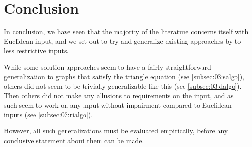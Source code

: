 \section{Conclusion}

In conclusion, we have seen that the majority of the literature concerns itself with Euclidean input,
and we set out to try and generalize existing approaches by \citeauthor{tsiligiridis_heuristic_1984} to less restrictive inputs. 

While some solution approaches seem to have a fairly straightforward generalization to graphs that satisfy the triangle equation (see \cref{subsec:03:salgo}),
others did not seem to be trivially generalizable like this (see \cref{subsec:03:dalgo}).
Then others did not make any allusions to requirements on the input, and as such seem to work on any input without impairment compared to Euclidean inputs (see \cref{subsec:03:rialgo}).

However, all such generalizations must be evaluated empirically, before any conclusive statement about them can be made.
